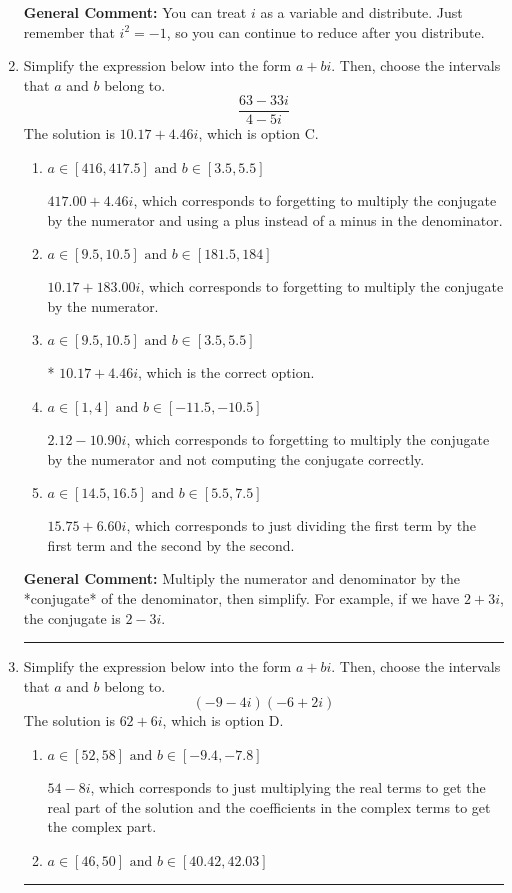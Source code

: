 \documentclass{extbook}[14pt]
\newcommand{\litem}[1]{\item #1

\rule{\textwidth}{0.4pt}}
\begin{document}
\begin{enumerate}
{\textbf{General Comment:} You can treat $i$ as a variable and distribute. Just remember that $i^2=-1$, so you can continue to reduce after you distribute.
}
\litem{
Simplify the expression below into the form $a+bi$. Then, choose the intervals that $a$ and $b$ belong to.
\[ \frac{63 - 33 i}{4 - 5 i} \]The solution is \( 10.17  + 4.46 i \), which is option C.\begin{enumerate}[label=\Alph*.]
\item \( a \in [416, 417.5] \text{ and } b \in [3.5, 5.5] \)

 $417.00  + 4.46 i$, which corresponds to forgetting to multiply the conjugate by the numerator and using a plus instead of a minus in the denominator.
\item \( a \in [9.5, 10.5] \text{ and } b \in [181.5, 184] \)

 $10.17  + 183.00 i$, which corresponds to forgetting to multiply the conjugate by the numerator.
\item \( a \in [9.5, 10.5] \text{ and } b \in [3.5, 5.5] \)

* $10.17  + 4.46 i$, which is the correct option.
\item \( a \in [1, 4] \text{ and } b \in [-11.5, -10.5] \)

 $2.12  - 10.90 i$, which corresponds to forgetting to multiply the conjugate by the numerator and not computing the conjugate correctly.
\item \( a \in [14.5, 16.5] \text{ and } b \in [5.5, 7.5] \)

 $15.75  + 6.60 i$, which corresponds to just dividing the first term by the first term and the second by the second.
\end{enumerate}

\textbf{General Comment:} Multiply the numerator and denominator by the *conjugate* of the denominator, then simplify. For example, if we have $2+3i$, the conjugate is $2-3i$.
}
\litem{
Simplify the expression below into the form $a+bi$. Then, choose the intervals that $a$ and $b$ belong to.
\[ (-9 - 4 i)(-6 + 2 i) \]The solution is \( 62 + 6 i \), which is option D.\begin{enumerate}[label=\Alph*.]
\item \( a \in [52, 58] \text{ and } b \in [-9.4, -7.8] \)

 $54 - 8 i$, which corresponds to just multiplying the real terms to get the real part of the solution and the coefficients in the complex terms to get the complex part.
\item \( a \in [46, 50] \text{ and } b \in [40.42, 42.03] \)


\end{enumerate}}
\end{enumerate}
\end{document}
